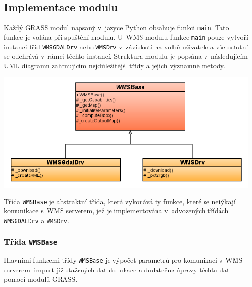 \documentclass[a4paper,12pt]{article}
\begin{document}
\subsection{Implementace modulu}

Každý GRASS modul napsaný v~jazyce Python obsahuje funkci {\tt main}.
Tato funkce je volána při spuštění modulu. U~WMS modulu 
 funkce {\tt main} pouze vytvoří instanci tříd {\tt WMSGDALDrv} nebo {\tt WMSDrv}
v~závislosti na volbě uživatele a vše ostatní se odehrává v~rámci 
těchto instancí. Struktura modulu je popsána v~následujícím UML diagramu 
zahrnujícím nejdůležitější třídy a jejich významné metody.

\begin{center}
 \includegraphics[scale=0.5]{figures/GRASS_UML.png}
\end{center}


Třída {\tt WMSBase} je abstraktní třída, která vykonává ty funkce, které se
netýkají komunikace s~WMS serverem, jež je implementována
v~odvozených třídách {\tt WMSGDALDrv} a {\tt WMSDrv}.

\subsubsection{Třída {\tt \bfseries WMSBase}}

Hlavními funkcemi třídy {\tt WMSBase} je výpočet parametrů pro komunikaci
s~WMS serverem, import již stažených dat do lokace a dodatečné úpravy
těchto dat pomocí modulů GRASS.
\end{document}
